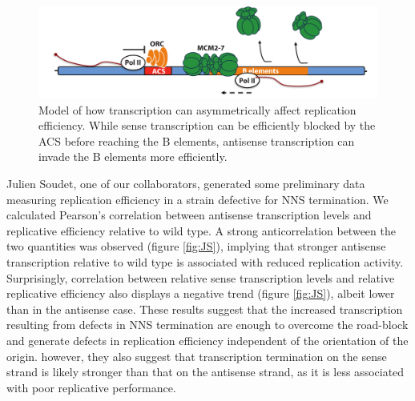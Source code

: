 \begin{figure}[h]

\centering
\includegraphics[width=\textwidth]{figures/results/model}
\caption[A model of how transcription can affect replication efficiency]{Model of how transcription can asymmetrically affect replication efficiency. While sense transcription can be efficiently blocked by the ACS before reaching the B elements, antisense transcription can invade the B elements more efficiently.}
\label{fig:model}

\end{figure} 

Julien Soudet, one of our collaborators, generated some preliminary data measuring replication efficiency in a strain defective for NNS termination. We calculated Pearson’s correlation between antisense transcription levels and replicative efficiency relative to wild type. A strong anticorrelation between the two quantities was observed (figure \ref{fig:JS}), implying that stronger antisense transcription relative to wild type is associated with reduced replication activity. Surprisingly, correlation between relative sense transcription levels and relative replicative efficiency also displays a negative trend (figure \ref{fig:JS}), albeit lower than in the antisense case. These results suggest that the increased transcription resulting from defects in NNS termination are enough to overcome the road-block and generate defects in replication efficiency independent of the orientation of the origin. however, they also suggest that transcription termination on the sense strand is likely stronger than that on the antisense strand, as it is less associated with poor replicative performance. 

